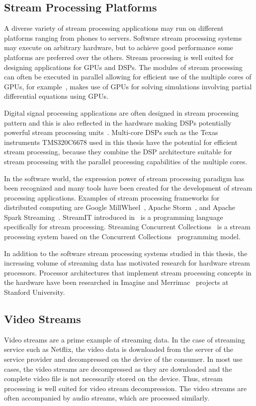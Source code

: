 \subsection{Stream Processing Platforms}
\label{subsec:stream-processing-platforms}
A diverse variety of stream processing applications may run on different platforms ranging from phones to servers. Software stream processing systems may execute on arbitrary hardware, but to achieve good performance some platforms are preferred over the others. Stream processing is well suited for designing applications for GPUs and DSPs. The modules of stream processing can often be executed in parallel allowing for efficient use of the multiple cores of GPUs, for example~\cite{goddeke2011fast}, makes use of GPUs for solving simulations involving partial differential equations using GPUs.

Digital signal processing applications are often designed in stream processing pattern and this is also reflected in the hardware making DSPs potentially powerful stream processing units~\cite{lee2015introduction}. Multi-core DSPs such as the Texas instruments TMS320C6678 used in this thesis have the potential for efficient stream processing, because they combine the DSP architecture suitable for stream processing with the parallel processing capabilities of the multiple cores.

In the software world, the expression power of stream processing paradigm has been recognized and many tools have been created for the development of stream processing applications. Examples of stream processing frameworks for distributed computing are Google MillWheel~\cite{tyler2013millwheel}, Apache Storm~\cite{apache2016storm}, and Apache Spark Streaming~\cite{apache2016spark}. StreamIT introduced in~\cite{thies2002streamit} is a programming language specifically for stream processing. Streaming Concurrent Collections~\cite{sbirlea2011scnc} is a stream processing system based on the Concurrent Collections~\cite{budimlic2010concurrent} programming model.

In addition to the software stream processing systems studied in this thesis, the increasing volume of streaming data has motivated research for hardware stream processors. Processor architectures that implement stream processing concepts in the hardware have been researched in Imagine \cite{kapasi2002imagine} and Merrimac~\cite{dally2003merrimac} projects at Stanford University.

\subsection{Video Streams}
\label{subsec:video-streams}
Video streams are a prime example of streaming data. In the case of streaming service such as Netflix, the video data is downloaded from the server of the service provider and decompressed on the device of the consumer. In most use cases, the video streams are decompressed as they are downloaded and the complete video file is not necessarily stored on the device. Thus, stream processing is well suited for video stream decompression. The video streams are often accompanied by audio streams, which are processed similarly.~\cite{richardson2002video}

